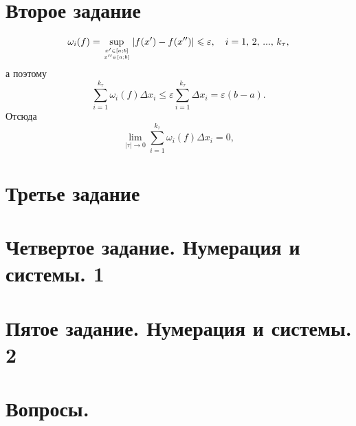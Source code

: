 \documentclass[a4paper,12pt]{article} %
\begin{document}
	\section{Второе задание}
	$$
		\omega_i(f) = \sup \limits_{x' \in \left[a ; b\right] \atop x'' \in \left[a ; b\right]} |f(x') -f(x'')| \leqslant \varepsilon, \quad
		i=1,\, 2, \, ... , \, k_\tau,
	$$
	а поэтому
	$$
		\sum \limits_{i=1}^{k_\tau} \omega_i(f) \Delta x_i \leqslant \varepsilon 
		\sum \limits_{i=1}^{k_\tau} \Delta x_i = 
		\varepsilon \left(b - a\right).
	$$
	Отсюда
	$$
		\lim \limits_{| \tau | \to 0} \sum \limits_{i=1}^{k_\tau} \omega_i(f) \Delta x_i = 0,
	$$
	
	
	\newpage
	\section{Третье задание}

	
	\newpage
	\section{Четвертое задание. Нумерация и системы. 1}
	
	
	\newpage
	\section{Пятое задание. Нумерация и системы. 2}
	
	
	\newpage
	\section{Вопросы.}
\end{document}
